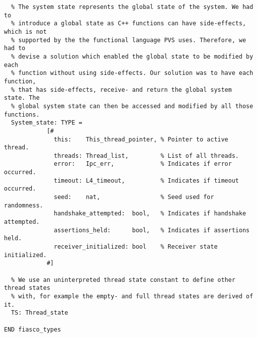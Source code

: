 \begin{lstlisting}
  % The system state represents the global state of the system. We had to 
  % introduce a global state as C++ functions can have side-effects, which is not
  % supported by the the functional language PVS uses. Therefore, we had to 
  % devise a solution which enabled the global state to be modified by each 
  % function without using side-effects. Our solution was to have each function,
  % that has side-effects, receive- and return the global system state. The 
  % global system state can then be accessed and modified by all those functions.
  System_state: TYPE = 
            [# 
              this:    This_thread_pointer, % Pointer to active thread.
              threads: Thread_list,         % List of all threads.
              error:   Ipc_err,             % Indicates if error occurred.
              timeout: L4_timeout,          % Indicates if timeout occurred.
              seed:    nat,                 % Seed used for randomness.
              handshake_attempted:  bool,   % Indicates if handshake attempted.
              assertions_held:      bool,   % Indicates if assertions held.
              receiver_initialized: bool    % Receiver state initialized.
            #]

  % We use an uninterpreted thread state constant to define other thread states
  % with, for example the empty- and full thread states are derived of it.
  TS: Thread_state

END fiasco_types
\end{lstlisting}